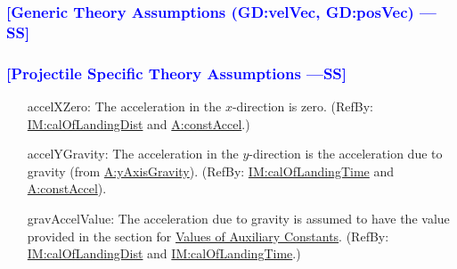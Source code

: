 \documentclass[12pt]{article}
\newcommand{\authornote}[3]{\textcolor{#1}{[#3 ---#2]}}
\newcommand{\authornote}[3]{}
\newcommand{\wss}[1]{\authornote{blue}{SS}{#1}}
\begin{document}
\subsubsection{\wss{Generic Theory Assumptions (GD:velVec, GD:posVec)}}


\subsubsection{\wss{Projectile Specific Theory Assumptions}}

\begin{itemize}
\item[accelXZero:\phantomsection\label{accelXZero}]{The acceleration in the $x$-direction is zero. (RefBy: \hyperref[IM:calOfLandingDist]{IM:calOfLandingDist} and \hyperref[constAccel]{A:constAccel}.)}
\item[accelYGravity:\phantomsection\label{accelYGravity}]{The acceleration in the $y$-direction is the acceleration due to gravity (from \hyperref[yAxisGravity]{A:yAxisGravity}). (RefBy: \hyperref[IM:calOfLandingTime]{IM:calOfLandingTime} and \hyperref[constAccel]{A:constAccel}).}
\item[gravAccelValue:\phantomsection\label{gravAccelValue}]{The acceleration due to gravity is assumed to have the value provided in the section for \hyperref[Sec:AuxConstants]{Values of Auxiliary Constants}. (RefBy: \hyperref[IM:calOfLandingDist]{IM:calOfLandingDist} and \hyperref[IM:calOfLandingTime]{IM:calOfLandingTime}.)}
\end{itemize}
\end{document}
